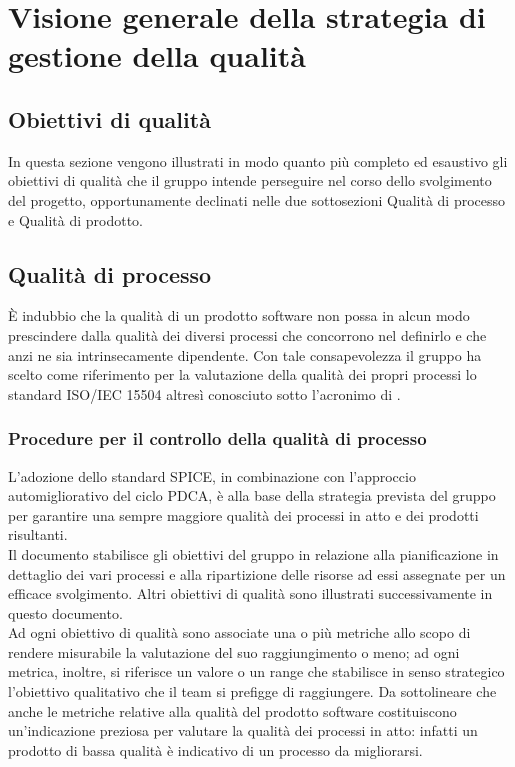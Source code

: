 \section{Visione generale della strategia di gestione della qualità}
	\subsection{Obiettivi di qualità}
	In questa sezione vengono illustrati in modo quanto più completo ed esaustivo gli obiettivi di qualità che il gruppo intende perseguire nel corso 	dello svolgimento del progetto, opportunamente declinati nelle due sottosezioni Qualità di processo e Qualità di prodotto.

	\subsection{Qualità di processo}
	È indubbio che la qualità di un prodotto software non possa in alcun modo prescindere dalla qualità dei diversi processi che concorrono nel definirlo e 	che anzi ne sia intrinsecamente dipendente. Con tale consapevolezza il gruppo ha scelto come riferimento per la valutazione della qualità dei propri processi lo standard ISO/IEC 15504 altresì conosciuto sotto l'acronimo di .
		\subsubsection{Procedure per il controllo della qualità di processo}
		L'adozione dello standard SPICE, in combinazione con l'approccio automigliorativo del ciclo PDCA, è alla base della strategia prevista del gruppo per garantire una sempre maggiore qualità dei processi in atto e dei prodotti risultanti.
		\\Il documento \PdP stabilisce gli obiettivi del gruppo in relazione alla pianificazione in dettaglio dei vari processi e alla ripartizione delle risorse ad essi assegnate per un efficace svolgimento. Altri obiettivi di qualità sono illustrati successivamente in questo documento.
		\\Ad ogni obiettivo di qualità sono associate una o più metriche allo scopo di rendere misurabile la valutazione del suo raggiungimento o meno; ad ogni metrica, inoltre, si riferisce un valore o un range che stabilisce in senso strategico l'obiettivo qualitativo che il team si prefigge di raggiungere. Da sottolineare che anche le metriche relative alla qualità del prodotto software costituiscono un'indicazione preziosa per valutare la qualità dei processi in atto: infatti un prodotto di bassa qualità è indicativo di un processo da migliorarsi.

